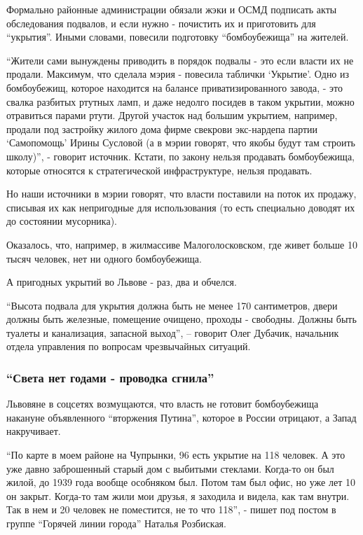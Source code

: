Формально районные администрации обязали жэки и ОСМД подписать акты
обследования подвалов, и если нужно - почистить их и приготовить для
\enquote{укрытия}.  Иными словами, повесили подготовку \enquote{бомбоубежища}
на жителей.

\enquote{Жители сами вынуждены приводить в порядок подвалы - это если власти их не
продали. Максимум, что сделала мэрия - повесила таблички \enquote{Укрытие}. Одно из
бомбоубежищ, которое находится на балансе приватизированного завода, - это
свалка разбитых ртутных ламп, и даже недолго посидев в таком укрытии, можно
отравиться  парами ртути. Другой участок над большим укрытием, например,
продали под застройку жилого дома фирме свекрови экс-нардепа партии
\enquote{Самопомощь} Ирины Сусловой (а в мэрии говорят, что якобы будут там строить
школу)}, - говорит источник. Кстати, по закону нельзя продавать бомбоубежища,
которые относятся к стратегической инфраструктуре, нельзя продавать.

Но наши источники в мэрии говорят, что власти поставили на поток их продажу,
списывая их как непригодные для использования (то есть специально доводят их до
состоянии мусорника).

Оказалось, что, например, в жилмассиве Малоголосковском, где живет больше 10
тысяч человек, нет ни одного бомбоубежища.

А пригодных укрытий во Львове - раз, два и обчелся.

\enquote{Высота подвала для укрытия должна быть не менее 170 сантиметров, двери должны
быть железные, помещение очищено, проходы - свободны. Должны быть туалеты и
канализация, запасной выход}, – говорит Олег Дубачик, начальник отдела
управления по вопросам чрезвычайных ситуаций.

\subsubsection{\enquote{Света нет годами - проводка сгнила}}

Львовяне в соцсетях возмущаются, что власть не готовит бомбоубежища накануне
объявленного \enquote{вторжения Путина}, которое в России отрицают, а Запад
накручивает. 

\enquote{По карте в моем районе на Чупрынки, 96 есть укрытие на 118 человек. А это уже
давно заброшенный старый дом с выбитыми стеклами. Когда-то он был жилой, до
1939 года вообще особняком был. Потом там был офис, но уже лет 10 он закрыт.
Когда-то там жили мои друзья, я заходила и видела, как там внутри. Так в нем и
20 человек не поместится, не то что 118}, - пишет под постом в группе \enquote{Горячей
линии города} Наталья Розбиская.

